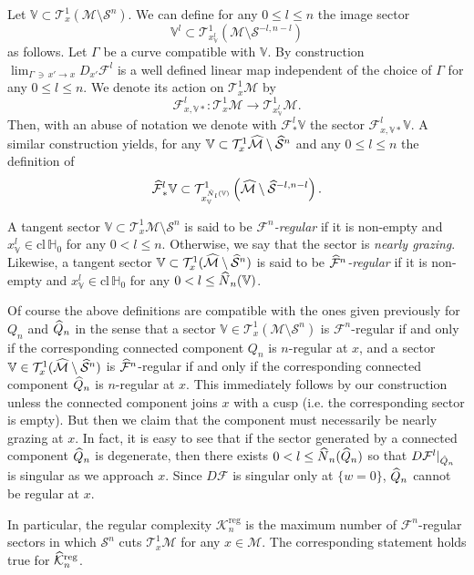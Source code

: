 \documentclass[AHL, Unicode, longabstracts,published]{cedram}
\newcommand{\cl}[1]{\mathrm{cl}\,#1}
\newcommand{\homo}{\mathbb{H}}
\newcommand{\tangu}{\mathcal{T}^1}
\newcommand{\cm}{\mathcal{F}}
\newcommand{\csp}{\mathcal{M}}
\newcommand{\cmp}{\hat\cm}
\newcommand{\cspi}{\widehat{\csp}}
\newcommand{\singPrivate}{\mathcal{S}}
\newcommand{\sing}[1]{\singPrivate^{#1}}
\newcommand{\singp}[1]{\hat{\singPrivate}^{#1}}
\newcommand{\ckreg}{\mathcal{K}^\text{reg}}
\newcommand{\ckregp}{\hat{\mathcal{K}}^\text{reg}}
\newcommand{\Np}{\hat N}
\newcommand{\cV}{\mathbb{V}}
\let\oldhat\hat
\renewcommand*{\hat}[1]{\mathchoice{\widehat{#1}}{\widehat{#1}}{\oldhat{#1}}{\oldhat{#1}}}
\begin{document}
Let $\cV\subset\tangu_{x}(\csp\setminus\sing n)$. We can define for any $0\le l\le n$ the image sector
\[
\cV^l\subset\tangu_{x^{l}_{\cV}}\left(\csp\setminus\sing{-l,n-l}\right)
\]
as follows. Let $\Gamma$ be a curve compatible with $\cV$. By construction
$\lim_{\Gamma\,\ni\,x'\to x}D_{x'}\cm^l$ is a well defined linear map independent of the choice of $\Gamma$ for any $0\le l\le n$. We denote its action on 
$\tangu_x\csp$ by 
\[
\cm_{x,\cV*}^{l}:\tangu_x\csp\to\tangu_{x^{l}_{\cV}}\csp.
\]
Then, with an abuse of notation we denote with $\cm^{l}_{*}\cV$ the sector $\cm^{l}_{x,\cV*}\cV$. A similar construction yields, for any $\cV\subset\tangu_{x}\cspi\setminus\singp n$ and any $0\le l\le n$ the definition of
\[
\cmp^{l}_{*}\cV\subset\tangu_{x^{\Np_l(\cV)}_{\cV}}\left(\cspi\setminus\singp{-l,n-l}\right).
\]

A tangent sector $\cV\subset\tangu_{x}\csp\setminus\sing n$ is said to be \emph{$\cm^n$-regular} if it is non-empty and $x_\cV^{l}\in\cl\homo_0$ for any $0 < l\le n$. Otherwise, we say that the sector is \emph{nearly grazing}. Likewise, a tangent sector $\cV\subset\tangu_{x}(\cspi\setminus\singp n)$ is said to be
\emph{$\cmp^n$-regular} if it is non-empty and $x_\cV^{l}\in\cl\homo_0$ for any $0 < l\le \Np_n(\cV)$.

Of course the above definitions are compatible with the ones given previously for $Q_n$ and $\hat Q_n$ in the sense that a sector $\cV\in\tangu_x(\csp\setminus\sing n)$ is $\cm^{n}$-regular if and only if the corresponding connected component $Q_n$ is $n$-regular at $x$, and a sector $\cV\in\tangu_x(\cspi\setminus\singp n)$ is $\cmp^{n}$-regular if and only if the corresponding connected component $\hat Q_n$ is $n$-regular at $x$. This immediately follows by our construction unless the connected component joins $x$ with a cusp (i.e. the corresponding sector is empty). But then we claim that the component must necessarily be nearly grazing at $x$. In fact, it is easy to see that if the sector generated by a connected component $\hat Q_n$ is degenerate, then there exists $0 < l\le \Np_n(\hat Q_n)$ so that $D\cm^l|_{\hat Q_n}$ is singular as we approach $x$. Since $D\cm$ is singular only at $\{w = 0\}$, $\hat Q_n$ cannot be regular at $x$.

In particular, the regular complexity $\ckreg_n$ is the maximum number of $\cm^{n}$-regular sectors in which $\sing n$ cuts $\tangu_x\csp$ for any $x\in\csp$. The corresponding statement holds true for $\ckregp_n$.
\end{document}
